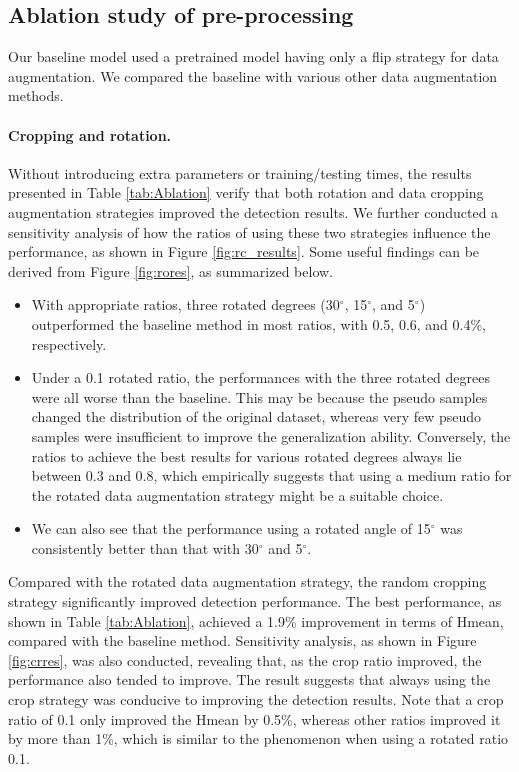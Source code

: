 \subsection{Ablation study of pre-processing}
\label{subsec:ab_pre}
Our baseline model used a pretrained model having only a flip strategy for data augmentation. We compared the baseline with various other data augmentation methods.

\paragraph{Cropping and rotation.} Without introducing extra parameters or training/testing times, the results presented in Table \ref{tab:Ablation} verify that both rotation and data cropping augmentation strategies improved the detection results. We further conducted a sensitivity analysis of how the ratios of using these two strategies influence the performance, as shown in Figure \ref{fig:rc_results}. Some useful findings can be derived from Figure \ref{fig:rores}, as summarized below.
\begin{itemize}
  \item With appropriate ratios, three rotated degrees (30$^{\circ}$, 15$^{\circ}$, and 5$^{\circ}$) outperformed the baseline method in most ratios, with 0.5, 0.6, and 0.4\%, respectively. 
  \item Under a 0.1 rotated ratio, the performances with the three rotated degrees were all worse than the baseline. This may be because the pseudo samples changed the distribution of the original dataset, whereas very few pseudo samples were insufficient to improve the generalization ability. Conversely, the ratios to achieve the best results for various rotated degrees always lie between 0.3 and 0.8, which empirically suggests that using a medium ratio for the rotated data augmentation strategy might be a suitable choice.
  \item We can also see that the performance using a rotated angle of 15$^{\circ}$ was consistently better than that with 30$^{\circ}$ and 5$^{\circ}$.
\end{itemize}

Compared with the rotated data augmentation strategy, the random cropping strategy significantly improved detection performance. The best performance, as shown in Table \ref{tab:Ablation}, achieved a 1.9\% improvement in terms of Hmean, compared with the baseline method. Sensitivity analysis, as shown in Figure \ref{fig:crres}, was also conducted, revealing that, as the crop ratio improved, the performance also tended to improve. The result suggests that always using the crop strategy was conducive to improving the detection results. Note that a crop ratio of 0.1 only improved the Hmean by 0.5\%, whereas other ratios improved it by more than 1\%, which is similar to the phenomenon when using a rotated ratio 0.1.

